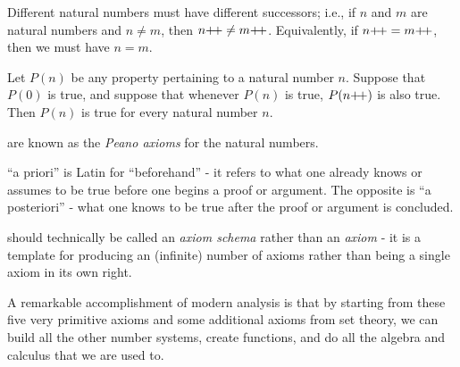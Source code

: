 \begin{ax}\label{i:2.4}
  Different natural numbers must have different successors;
  i.e., if \(n\) and \(m\) are natural numbers and \(n \neq m\), then \(n{+}\!{+} \neq m{+}\!{+}\).
  Equivalently, if \(n{+}\!{+} = m{+}\!{+}\), then we must have \(n = m\).
\end{ax}

\begin{ax}\label{i:2.5}
  Let \(P(n)\) be any property pertaining to a natural number \(n\).
  Suppose that \(P(0)\) is true, and suppose that whenever \(P(n)\) is true, \(P(n{+}\!{+})\) is also true.
  Then \(P(n)\) is true for every natural number \(n\).
\end{ax}

\begin{note}
   are known as the \emph{Peano axioms} for the natural numbers.
\end{note}

\begin{note}
  ``a priori'' is Latin for ``beforehand''
  - it refers to what one already knows or assumes to be true before one begins a proof or argument.
  The opposite is ``a posteriori''
  - what one knows to be true after the proof or argument is concluded.
\end{note}

\begin{note}
   should technically be called an \emph{axiom schema} rather than an \emph{axiom}
  - it is a template for producing an (infinite) number of axioms rather than being a single axiom in its own right.
\end{note}

\begin{note}
  A remarkable accomplishment of modern analysis is that by starting from these five very primitive axioms and some additional axioms from set theory, we can build all the other number systems, create functions, and do all the algebra and calculus that we are used to.
\end{note}
